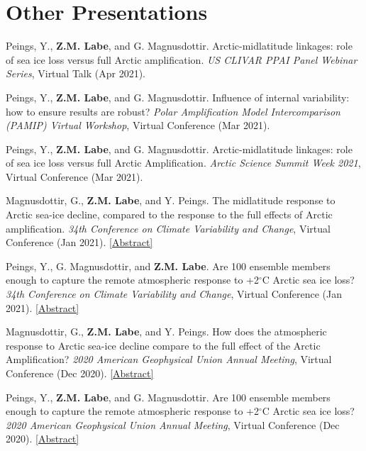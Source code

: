 \documentclass[margin,line,palatino,courier,10pt]{res}
\begin{document}
\begin{resume}
\begin{etaremune}[leftmargin=0in,topsep=0in,parsep=0in]
\end{etaremune}

\section{\sc \textcolor{Cerulean}{\large{\textbf{Other Presentations}}}} 
\begin{etaremune}[leftmargin=0in,topsep=0in,parsep=0in]
\item Peings, Y., \textbf{Z.M. Labe}, and G. Magnusdottir. Arctic-midlatitude linkages: role of sea ice loss versus full Arctic amplification. \textit{US CLIVAR PPAI Panel Webinar Series}, Virtual Talk (Apr 2021).
\item Peings, Y., \textbf{Z.M. Labe}, and G. Magnusdottir. Influence of internal variability: how to ensure results are robust? \textit{Polar Amplification Model Intercomparison (PAMIP) Virtual Workshop}, Virtual Conference (Mar 2021).
\item Peings, Y., \textbf{Z.M. Labe}, and G. Magnusdottir. Arctic-midlatitude linkages: role of sea ice loss versus full Arctic Amplification. \textit{Arctic Science Summit Week 2021}, Virtual Conference (Mar 2021).
\item Magnusdottir, G., \textbf{Z.M. Labe}, and Y. Peings. The midlatitude response to Arctic sea-ice decline, compared to the response to the full effects of Arctic amplification. \textit{34th Conference on Climate Variability and Change}, Virtual Conference (Jan 2021). \href{https://ams.confex.com/ams/101ANNUAL/meetingapp.cgi/Paper/382356}{[Abstract]}
\item Peings, Y., G. Magnusdottir, and \textbf{Z.M. Labe}. Are 100 ensemble members enough to capture the remote atmospheric response to +2$^{\circ}$C Arctic sea ice loss? \textit{34th Conference on Climate Variability and Change}, Virtual Conference (Jan 2021). \href{https://ams.confex.com/ams/101ANNUAL/meetingapp.cgi/Paper/382352}{[Abstract]}
\item Magnusdottir, G., \textbf{Z.M. Labe}, and Y. Peings. How does the atmospheric response to Arctic sea-ice decline compare to the full effect of the Arctic Amplification? \textit{2020 American Geophysical Union Annual Meeting}, Virtual Conference (Dec 2020). \href{https://agu.confex.com/agu/fm20/meetingapp.cgi/Paper/678706}{[Abstract]}
\item Peings, Y., \textbf{Z.M. Labe}, and G. Magnusdottir. Are 100 ensemble members enough to capture the remote atmospheric response to +2$^{\circ}$C Arctic sea ice loss? \textit{2020 American Geophysical Union Annual Meeting}, Virtual Conference (Dec 2020). \href{https://agu.confex.com/agu/fm20/meetingapp.cgi/Paper/685885}{[Abstract]}

\end{etaremune}
\end{resume}
\end{document}
